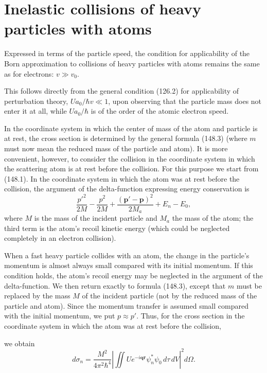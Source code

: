 \section{Inelastic collisions of heavy particles with atoms}

Expressed in terms of the particle speed, the condition for applicability of
the Born approximation to collisions of heavy particles with atoms remains
the same as for electrons: $v\gg v_0$.

This follows directly from the general condition (126.2) for applicability of
perturbation theory, $Ua_0/\hbar v\ll1$, upon observing that the particle mass
does not enter it at all, while $Ua_0/\hbar$ is of the order of the atomic
electron speed.

In the coordinate system in which the center of mass of the atom and particle
is at rest, the cross section is determined by the general formula (148.3)
(where $m$ must now mean the reduced mass of the particle and atom). It is
more convenient, however, to consider the collision in the coordinate system
in which the scattering atom is at rest before the collision. For this
purpose we start from (148.1). In the coordinate system in which the atom was
at rest before the collision, the argument of the delta-function expressing
energy conservation is
\begin{equation}
 \frac{p'^2}{2M}-\frac{p^2}{2M}+
 \frac{(\mathbf p'-\mathbf p)^2}{2M_a}+E_n-E_0,
 \tag{150.1}
\end{equation}
where $M$ is the mass of the incident particle and $M_a$ the mass of the atom;
the third term is the atom's recoil kinetic energy (which could be neglected
completely in an electron collision).

When a fast heavy particle collides with an atom, the change in the particle's
momentum is almost always small compared with its initial momentum. If this
condition holds, the atom's recoil energy may be neglected in the argument of
the delta-function. We then return exactly to formula (148.3), except that
$m$ must be replaced by the mass $M$ of the incident particle (not by the
reduced mass of the particle and atom). Since the momentum transfer is
assumed small compared with the initial momentum, we put $p\approx p'$.
Thus, for the cross section in the coordinate system in which the atom was at
rest before the collision,

we obtain
\begin{equation}
 d\sigma_n=\frac{M^2}{4\pi^2\hbar^4}
 \left|\iint Ue^{-i\mathbf q\mathbf r}\psi_n^*\psi_0\,d\tau\,dV\right|^2d\Omega.
 \tag{150.2}
\end{equation}

